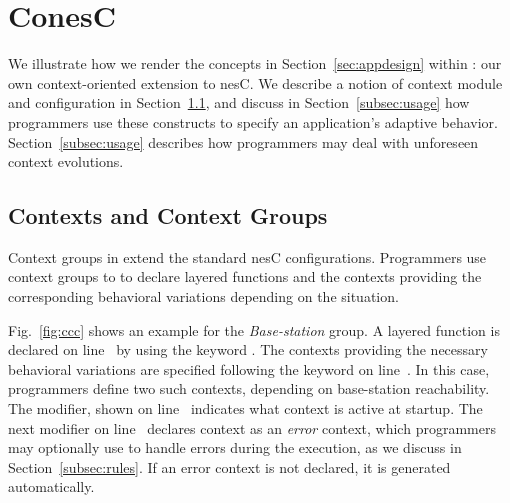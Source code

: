 
\section{ConesC}\label{sec:conesc}


We illustrate how we render the concepts in
Section~\ref{sec:appdesign} within \conesc: our own context-oriented
extension to nesC.  We describe a notion of context module and
configuration in Section~\ref{subsec:components}, and discuss in
Section~\ref{subsec:usage} how programmers use these constructs to
specify an application's adaptive behavior.
Section~\ref{subsec:usage} describes how \conesc programmers may deal
with unforeseen context evolutions.

\subsection{Contexts and Context Groups}\label{subsec:components}


Context groups in \conesc extend the standard nesC
configurations. Programmers use context groups to to declare layered
functions and the contexts providing the corresponding behavioral
variations depending on the situation. 

Fig.~\ref{fig:ccc} shows an example for the \emph{Base-station}
group. A layered  function is declared on
line~ by using the keyword . The
contexts providing the necessary behavioral variations are specified
following the keyword  on line~. In
this case, programmers define two such contexts, depending on
base-station reachability. The  modifier, shown on
line~ indicates what context is active at
startup. The next  modifier on line~
declares context  as an \emph{error} context, which
programmers may optionally use to handle errors during the execution,
as we discuss in Section~\ref{subsec:rules}. If an error context is
not declared, it is generated automatically.

